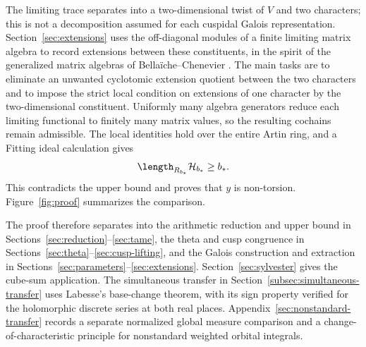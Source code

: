 The limiting trace separates into a two-dimensional twist of $V$
and two characters; this is not a decomposition assumed for each
cuspidal Galois representation. Section~\ref{sec:extensions} uses
the off-diagonal modules of a finite limiting matrix algebra to
record extensions between these constituents, in the spirit of
the generalized matrix algebras of Bella\"iche--Chenevier
\citep{BellaicheChenevier2009}.
The main tasks are to eliminate an unwanted cyclotomic extension
quotient between the two characters and to impose the strict local
condition on extensions
of one character by the two-dimensional constituent. Uniformly
many algebra generators reduce each limiting functional to finitely
many matrix values, so the resulting cochains remain admissible.
The local identities hold over the entire Artin ring, and a Fitting
ideal calculation gives
\[
 \length_{R_{b_*}}\mathcal H_{b_*}\ge b_*.
\]
This contradicts the upper bound and proves that $y$ is non-torsion.
Figure~\ref{fig:proof} summarizes the comparison.



The proof therefore separates into the arithmetic reduction and
upper bound in Sections~\ref{sec:reduction}--\ref{sec:tame}, the theta
and cusp congruence in Sections~\ref{sec:theta}--\ref{sec:cusp-lifting},
and the Galois construction and extraction in
Sections~\ref{sec:parameters}--\ref{sec:extensions}.
Section~\ref{sec:sylvester} gives the cube-sum application.
The simultaneous transfer in Section~\ref{subsec:simultaneous-transfer}
uses Labesse's base-change theorem, with its sign property verified
for the holomorphic discrete series at both real places.
Appendix~\ref{sec:nonstandard-transfer} records a separate normalized
global measure comparison and a change-of-characteristic principle
for nonstandard weighted orbital integrals.
